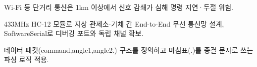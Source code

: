 \begin{substeps}
  \item Wi-Fi 등 단거리 통신은 1km 이상에서 신호 감쇄가 심해 명령 지연·두절 위험.
  \item 433MHz HC-12 모듈로 지상 관제소-기체 간 End-to-End 무선 통신망 설계, SoftwareSerial로 디버깅 포트와 독립 채널 확보.
  \item 데이터 패킷(command,angle1,angle2.) 구조를 정의하고 마침표(.)를 종결 문자로 쓰는 파싱 로직 적용.
\end{substeps}

